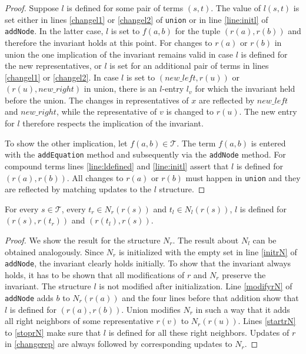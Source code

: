 \begin{proof}

Suppose $l$ is defined for some pair of terms $(s,t)$.
The value of $l(s,t)$ is set either in lines \ref{changel1} or \ref{changel2} of \texttt{union} or in line \ref{line:initl} of \texttt{addNode}.
In the latter case, $l$ is set to $f(a,b)$ for the tuple $(r(a),r(b))$ and therefore the invariant holds at this point.
For changes to $r(a)$ or $r(b)$ in union the one implication of the invariant remains valid in case $l$ is defined for the new representatives, or $l$ is set for an additional pair of terms in lines \ref{changel1} or \ref{changel2}.
In case $l$ is set to $(new\_left,r(u))$ or $(r(u),new\_right)$ in union, there is an $l$-entry $l_v$ for which the invariant held before the union.
The changes in representatives of $x$ are reflected by $new\_left$ and $new\_right$, while the representative of $v$ is changed to $r(u)$.
The new entry for $l$ therefore respects the implication of the invariant.

To show the other implication, let $f(a,b) \in \mathcal{T}$.
The term $f(a,b)$ is entered with the \texttt{addEquation} method and subsequently via the \texttt{addNode} method.
For compound terms lines \ref{line:ldefined} and \ref{line:initl} assert that $l$ is defined for $(r(a),r(b))$.
All changes to $r(a)$ or $r(b)$ must happen in \texttt{union} and they are reflected by matching updates to the $l$ structure.

\end{proof}


\begin{invariant}[Neighbours]

For every $s \in \mathcal{T}$, every $t_r \in N_r(r(s))$ and $t_l \in N_l(r(s))$, $l$ is defined for $(r(s),r(t_r))$ and $(r(t_l),r(s))$.

\end{invariant}

\begin{proof}

We show the result for the structure $N_r$.
The result about $N_l$ can be obtained analogously.
Since $N_r$ is initialized with the empty set in line \ref{initrN} of \texttt{addNode}, the invariant clearly holds initially.
To show that the invariant always holds, it has to be shown that all modifications of $r$ and $N_r$ preserve the invariant.
The structure $l$ is not modified after initialization.
Line \ref{modifyrN} of \texttt{addNode} adds $b$ to $N_r(r(a))$ and the four lines before that addition show that $l$ is defined for $(r(a),r(b))$.
Union modifies $N_r$ in such a way that it adds all right neighbors of some representative $r(v)$ to $N_r(r(u))$.
Lines \ref{startrN} to \ref{stoprN} make sure that $l$ is defined for all these right neighbors.
Updates of $r$ in \ref{changerep} are always followed by corresponding updates to $N_r$.

\end{proof}

